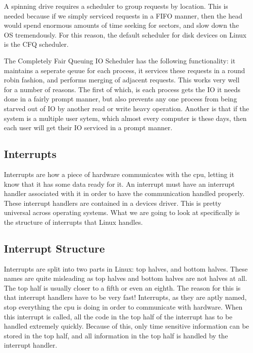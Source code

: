 \documentclass[10pt,letterpaper,onecolumn,draftclsnofoot]{IEEEtran}
\begin{document}
  A spinning drive requires a scheduler to group requests by location. This is
  needed because if we simply serviced requests in a FIFO manner, then the head
  would spend enormous amounts of time seeking for sectors, and slow down \cite{internals2}the OS
  tremendously. For this reason, the default scheduler for disk devices on Linux
  is the CFQ scheduler.

  The Completely Fair Queuing IO Scheduler has the following functionality: it
  maintains a seperate qeuue for each process, it services these requests in a round
  robin fashion, and performs merging of adjacent requests. This works very well
  for a number of reasons. The first of which, is each process gets the IO it needs
  done in a fairly prompt manner, but also prevents any one process from being
  starved out of IO by another read or write heavy operation. Another is that
  if the system is a multiple user sytem, which almost every computer is these
  days, then each user will get their IO serviced in a prompt manner. \cite{robertlove2010}

  \subsection{Interrupts}
  Interrupts are how a piece of hardware communicates with the cpu, letting it
  know that it has some data ready for it. An interrupt must have an interrupt
  handler associated with it in order to have the communication handled properly.
  These interrupt handlers are contained in a devices driver. This is pretty
  universal across operating systems. What we are going to look at specifically
  is the structure of interrupts that Linux handles. \cite{robertlove2010}

  \subsection{Interrupt Structure}
  Interrupts are split into two parts in Linux: top halves, and bottom halves.
  These names are quite misleading as top halves and bottom halves are not halves
  at all. The top half is usually closer to a fifth or even an eighth. The reason
  for this is that interrupt handlers have to be very fast! Interrupts, as they
  are aptly named, stop everything the cpu is doing in order to communicate with
  hardware. When this interrupt is called, all the code in the top half of the
  interrupt has to be handled extremely quickly. Because of this, only time sensitive
  information can be stored in the top half, and all information in the top half
  is handled by the interrupt handler.
\end{document}
